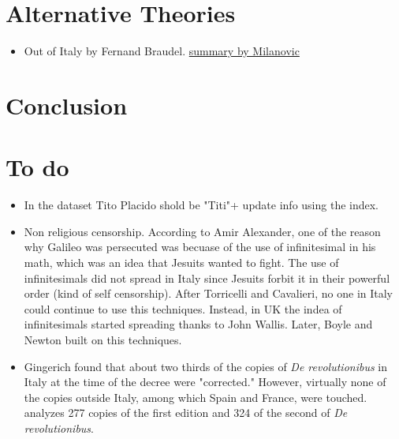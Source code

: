 \documentclass[12pt]{article}
\begin{document}
\section{Alternative Theories}

\begin{itemize}
\item Out of Italy by Fernand Braudel. \href{https://www.globalpolicyjournal.com/blog/07/08/2020/darkness-illuminated-world-italy-braudel}{summary by Milanovic}	
\end{itemize}

\section{Conclusion}

\section{To do}
\begin{itemize}
\item In the dataset Tito Placido shold be "Titi"+ update info using the index.
\item Non religious censorship. According to Amir Alexander, one of the reason why Galileo was persecuted was becuase of the use of infinitesimal in his math, which was an idea that Jesuits wanted to fight. The use of infinitesimals did not spread in Italy since Jesuits forbit it in their powerful order (kind of self censorship). After Torricelli and Cavalieri, no one in Italy could continue to use this techniques. Instead, in UK the indea of infinitesimals started spreading thanks to John Wallis. Later, Boyle and Newton built on this techniques.	
\item Gingerich found that about two thirds of the copies of \textit{De revolutionibus} in Italy at the time of the decree were "corrected." However, virtually none of the copies outside Italy, among which Spain and France, were touched. \cite{gingerich2004} analyzes 277 copies of the first edition and 324 of the second of \textit{De revolutionibus}.
\end{itemize}	
\end{document}
